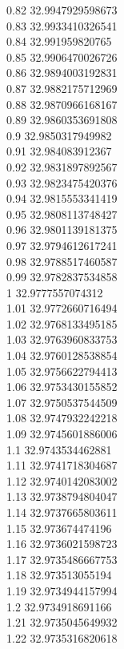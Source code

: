 {0.82	32.9947929598673\\
0.83	32.9933410326541\\
0.84	32.991959820765\\
0.85	32.9906470026726\\
0.86	32.9894003192831\\
0.87	32.9882175712969\\
0.88	32.9870966168167\\
0.89	32.9860353691808\\
0.9	32.9850317949982\\
0.91	32.984083912367\\
0.92	32.9831897892567\\
0.93	32.9823475420376\\
0.94	32.9815553341419\\
0.95	32.9808113748427\\
0.96	32.9801139181375\\
0.97	32.9794612617241\\
0.98	32.9788517460587\\
0.99	32.9782837534858\\
1	32.9777557074312\\
1.01	32.9772660716494\\
1.02	32.9768133495185\\
1.03	32.9763960833753\\
1.04	32.9760128538854\\
1.05	32.9756622794413\\
1.06	32.9753430155852\\
1.07	32.9750537544509\\
1.08	32.9747932242218\\
1.09	32.9745601886006\\
1.1	32.9743534462881\\
1.11	32.9741718304687\\
1.12	32.9740142083002\\
1.13	32.9738794804047\\
1.14	32.9737665803611\\
1.15	32.973674474196\\
1.16	32.9736021598723\\
1.17	32.9735486667753\\
1.18	32.973513055194\\
1.19	32.9734944157994\\
1.2	32.9734918691166\\
1.21	32.9735045649932\\
1.22	32.9735316820618\\
}
